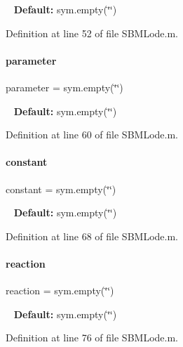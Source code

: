 ~\newline
{\bfseries Default\+:} sym.\+empty(\char`\"{}\char`\"{}) 

Definition at line 52 of file S\+B\+M\+Lode.\+m.

\mbox{\label{class_s_b_m_lode_a0d71b5c1dcca8d3fee88d6a11d3e2071}} 
\paragraph{\texorpdfstring{parameter}{parameter}}
{\footnotesize\ttfamily parameter = sym.\+empty(\char`\"{}\char`\"{})}

~\newline
{\bfseries Default\+:} sym.\+empty(\char`\"{}\char`\"{}) 

Definition at line 60 of file S\+B\+M\+Lode.\+m.

\mbox{\label{class_s_b_m_lode_a391f14c28a859734cd091e4e521bb8f8}} 
\paragraph{\texorpdfstring{constant}{constant}}
{\footnotesize\ttfamily constant = sym.\+empty(\char`\"{}\char`\"{})}

~\newline
{\bfseries Default\+:} sym.\+empty(\char`\"{}\char`\"{}) 

Definition at line 68 of file S\+B\+M\+Lode.\+m.

\mbox{\label{class_s_b_m_lode_ab342dbdf93b408b2c4bc416ea1701178}} 
\paragraph{\texorpdfstring{reaction}{reaction}}
{\footnotesize\ttfamily reaction = sym.\+empty(\char`\"{}\char`\"{})}

~\newline
{\bfseries Default\+:} sym.\+empty(\char`\"{}\char`\"{}) 

Definition at line 76 of file S\+B\+M\+Lode.\+m.

